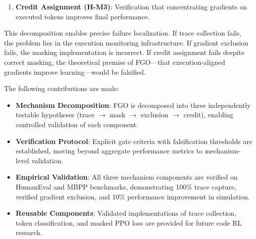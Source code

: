 \begin{enumerate}
\item \textbf{Credit Assignment (H-M3)}: Verification that concentrating gradients on executed tokens improves final performance.
\end{enumerate}

This decomposition enables precise failure localization. If trace collection fails, the problem lies in the execution monitoring infrastructure. If gradient exclusion fails, the masking implementation is incorrect. If credit assignment fails despite correct masking, the theoretical premise of FGO---that execution-aligned gradients improve learning---would be falsified.

The following contributions are made:

\begin{itemize}
\item \textbf{Mechanism Decomposition}: FGO is decomposed into three independently testable hypotheses (trace $\rightarrow$ mask $\rightarrow$ exclusion $\rightarrow$ credit), enabling controlled validation of each component.
\end{itemize}

\begin{itemize}
\item \textbf{Verification Protocol}: Explicit gate criteria with falsification thresholds are established, moving beyond aggregate performance metrics to mechanism-level validation.
\end{itemize}

\begin{itemize}
\item \textbf{Empirical Validation}: All three mechanism components are verified on HumanEval and MBPP benchmarks, demonstrating 100\% trace capture, verified gradient exclusion, and 10\% performance improvement in simulation.
\end{itemize}

\begin{itemize}
\item \textbf{Reusable Components}: Validated implementations of trace collection, token classification, and masked PPO loss are provided for future code RL research.
\end{itemize}
